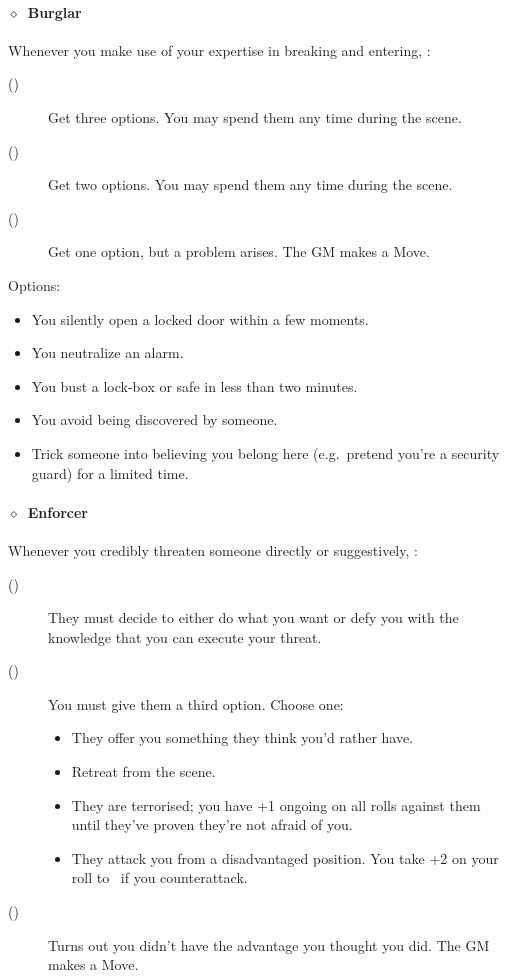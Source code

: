\paragraph{\(\diamond\)~Burglar}%
Whenever you make use of your expertise in breaking and entering, :
\begin{description}
 \item[()] Get three options. You may spend them any time during the scene.
 \item[()] Get two options. You may spend them any time during the scene.
 \item[()] Get one option, but a problem arises. The GM makes a Move.
\end{description}
\KULTrule%
Options:
\begin{itemize}
  \item You silently open a locked door within a few moments.
  \item You neutralize an alarm.
  \item You bust a lock-box or safe in less than two minutes.
  \item You avoid being discovered by someone.
  \item Trick someone into believing you belong here (e.g.~pretend you’re a security guard) for a
        limited time.
\end{itemize}
\KULTrule%

\paragraph{\(\diamond\)~Enforcer}%
Whenever you credibly threaten someone directly or suggestively, :
\begin{description}
 \item[()] They must decide to either do what you want or defy you
with the knowledge that you can execute your threat.
 \item[()] You must give them a third option. Choose one:
   \begin{itemize}
     \item They offer you something they think you'd rather have.
     \item Retreat from the scene.
     \item They are terrorised; you have +1 ongoing on all rolls against them until they've proven
           they’re not afraid of you.
     \item They attack you from a disadvantaged position. You take +2
           on your roll to ~if you counterattack.
   \end{itemize}
 \item[()] Turns out you didn't have the advantage you thought you did. The GM makes a
                       Move.
\end{description}
\KULTrule%

